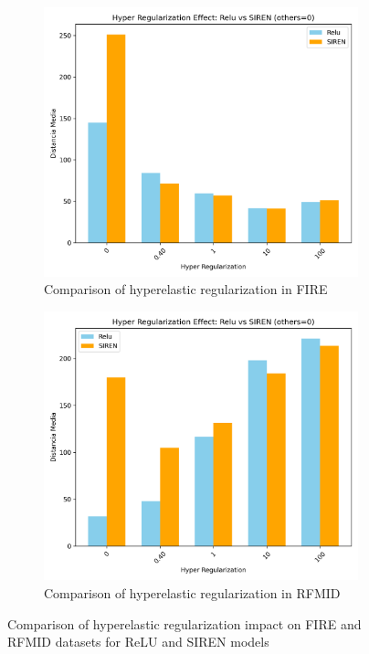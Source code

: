 \begin{figure}[tbp]
    \centering
    \begin{subfigure}[b]{0.48\textwidth}
        \centering
        \includegraphics[width=\textwidth]{imaxes/reg_examples/barplot_hyper_reg_comparison_MLP_vs_SIREN_FIRE.png}
        \caption{Comparison of hyperelastic regularization in FIRE}
        \label{fig:barplot_hyper_reg_comparison_MLP_vs_SIREN_FIRE}
    \end{subfigure}\hfill
    \begin{subfigure}[b]{0.48\textwidth}
        \centering
        \includegraphics[width=\textwidth]{imaxes/reg_examples/barplot_hyper_reg_comparison_MLP_vs_SIREN_RFMID.png}
        \caption{Comparison of hyperelastic regularization in RFMID}
        \label{fig:barplot_hyper_reg_comparison_MLP_vs_SIREN_RFMID}
    \end{subfigure}
    \caption{Comparison of hyperelastic regularization impact on FIRE and RFMID datasets for ReLU and SIREN models}
    \label{fig:barplot_hyper_reg_comparison}
\end{figure}

